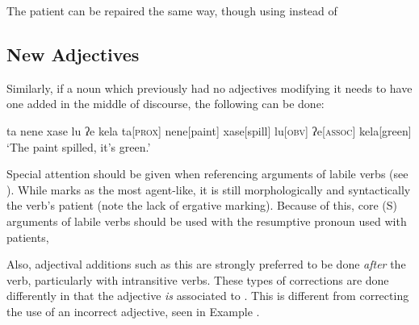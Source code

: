 The patient can be repaired the same way, though using  instead of 
\subsection{New Adjectives}
Similarly, if a noun which previously had no adjectives modifying it needs to have one added in the middle of discourse, the following can be done:

\ex
\begingl
\glpreamble ta nene xase lu ʔe kela
\endpreamble
ta[\textsc{prox}]
nene[paint]
xase[spill]
lu[\textsc{obv}]
ʔe[\textsc{assoc}]
kela[green]
\glft `The paint spilled, it's green.'
\endgl
\xe


Special attention should be given when referencing arguments of labile verbs (see ). While  marks  as the most agent-like, it is still morphologically and syntactically the verb's patient (note the lack of ergative marking). Because of this, core (S) arguments of labile verbs should be used with the resumptive pronoun used with patients, 

Also, adjectival additions such as this are strongly preferred to be done \textit{after} the verb, particularly with intransitive verbs. These types of corrections are done differently in that the adjective \textit{is} associated to . This is different from correcting the use of an incorrect adjective, seen in Example .